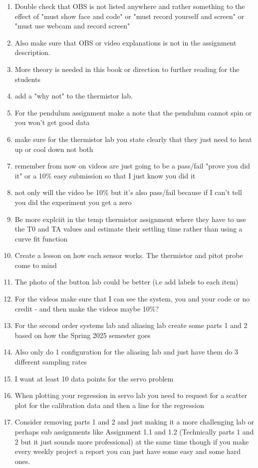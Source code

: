 \begin{enumerate}[itemsep=-5pt]
\item Double check that OBS is not listed anywhere and rather something to the effect of "must show face and code" or "must record yourself and screen" or "must use webcam and record screen"
\item Also make sure that OBS or video explanations is not in the assignment description.
\item More theory is needed in this book or direction to further
  reading for the students
\item add a "why not" to the thermistor lab.
\item For the pendulum assignment make a note that the pendulum cannot spin or you won't get good data
\item make sure for the thermistor lab you state clearly that they just need to heat up or cool down not both
\item remember from now on videos are just going to be a pass/fail "prove you did it" or a 10\% easy submission so that I just know you did it
\item not only will the video be 10\% but it's also pass/fail because if I can't tell you did the experiment you get a zero
\item Be more explciit in the temp thermistor assignment where they have to use the T0 and TA values and estimate their settling time rather than using a curve fit function
\item Create a lesson on how each sensor works. The thermistor and pitot probe come to mind 
\item The photo of the button lab could be better (i.e add labels to
  each item)
\item For the videos make sure that I can see the system, you and your code or no credit - and then make the videos maybe 10\%?
\item For the second order systems lab and aliasing lab create some parts 1 and 2 based on how the Spring 2025 semester goes
\item Also only do 1 configuration for the aliasing lab and just have them do 3 different sampling rates
\item I want at least 10 data points for the servo problem
\item When plotting your regression in servo lab you need to request for a scatter plot for the calibration data and then a line for the regression
\item Consider removing parts 1 and 2 and just making it a more challenging lab or perhaps sub assignments like Assignment 1.1 and 1.2 (Technically parts 1 and 2 but it just sounds more professional) at the same time though if you make every weekly project a report you can just have some easy and some hard ones.

\end{enumerate}
